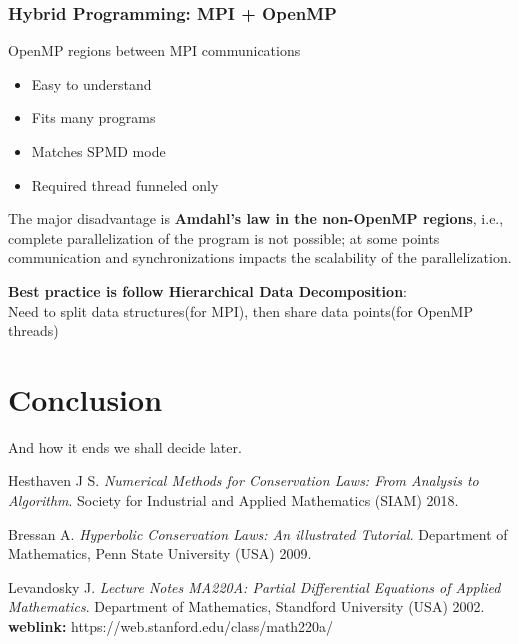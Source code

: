 \documentclass[12pt, a4paper]{report}
\begin{document}
\subsection{Hybrid Programming: MPI + OpenMP}
OpenMP regions between MPI communications
\begin{itemize}
    \item Easy to understand
    \item Fits many programs
    \item Matches SPMD mode
    \item Required thread funneled only
\end{itemize}

The major disadvantage is {\bfseries{Amdahl's law in the non-OpenMP regions}}, i.e., complete parallelization of the program is not possible; at some points 
communication and synchronizations impacts the scalability of the parallelization.

{\bfseries{Best practice is follow Hierarchical Data Decomposition}}: \\
Need to split data structures(for MPI), then share data points(for OpenMP threads)

  


    




    







\chapter*{Conclusion}
And how it ends we shall decide later.





\newpage
\begin{thebibliography}{3}
Hesthaven J S. \textit{Numerical Methods for Conservation Laws: From Analysis to Algorithm}. Society for Industrial and Applied Mathematics (SIAM) 2018.
    
Bressan A. \textit{Hyperbolic Conservation Laws: An illustrated Tutorial}. Department of Mathematics, Penn State University (USA) 2009.

Levandosky J. \textit{Lecture Notes MA220A: Partial Differential Equations of Applied Mathematics}. Department of Mathematics, Standford University (USA) 2002.\\
{\bfseries weblink:} https://web.stanford.edu/class/math220a/  
\end{thebibliography}
\end{document}
